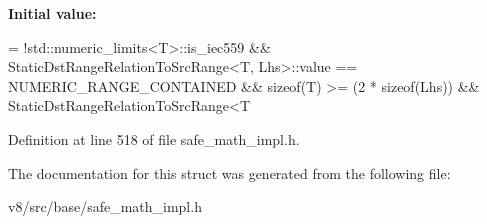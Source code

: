 {\bfseries Initial value\+:}
\begin{DoxyCode}
= !std::numeric\_limits<T>::is\_iec559 &&
                            StaticDstRangeRelationToSrcRange<T, Lhs>::value ==
                                NUMERIC\_RANGE\_CONTAINED &&
                            \textcolor{keyword}{sizeof}(T) >= (2 * \textcolor{keyword}{sizeof}(Lhs)) &&
                            StaticDstRangeRelationToSrcRange<T
\end{DoxyCode}


Definition at line 518 of file safe\+\_\+math\+\_\+impl.\+h.



The documentation for this struct was generated from the following file\+:\begin{DoxyCompactItemize}
\item 
v8/src/base/safe\+\_\+math\+\_\+impl.\+h\end{DoxyCompactItemize}
